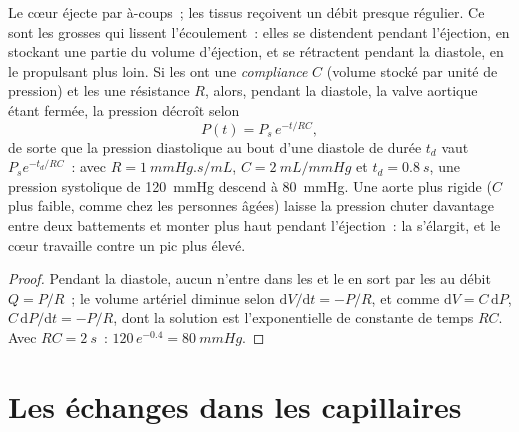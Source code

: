 \begin{theorem}\label{thm:b2:blood-circulation:windkessel}
Le cœur éjecte par à-coups~; les tissus reçoivent un débit presque
régulier. Ce sont les grosses  qui lissent l'écoulement~: elles
se distendent pendant l'éjection, en stockant une partie du volume
d'éjection, et se rétractent pendant la diastole, en le propulsant plus
loin. Si les  ont une \emph{compliance} $C$ (volume stocké par
unité de pression) et les  une résistance $R$, alors, pendant
la diastole, la valve aortique étant fermée, la pression décroît selon
\[
P(t) = P_{s}\,e^{-t/RC},
\]
de sorte que la pression diastolique au bout d'une diastole de durée
$t_d$ vaut $P_s e^{-t_d/RC}$~: avec $R = \qty{1}{mmHg.s/mL}$, $C =
\qty{2}{mL/mmHg}$ et $t_d = \qty{0.8}{s}$, une pression systolique de
\qty{120}{mmHg} descend à \qty{80}{mmHg}. Une aorte plus rigide ($C$
plus faible, comme chez les personnes âgées) laisse la pression chuter
davantage entre deux battements et monter plus haut pendant
l'éjection~: la \emph{} s'élargit, et le cœur
travaille contre un pic plus élevé.
\end{theorem}
\begin{proof}
Pendant la diastole, aucun  n'entre dans les  et le  en
sort par les  au débit $Q = P/R$~; le volume artériel diminue
selon
$\mathrm{d}V/\mathrm{d}t = -P/R$, et comme $\mathrm{d}V = C\,
\mathrm{d}P$, $C\,\mathrm{d}P/\mathrm{d}t = -P/R$, dont la solution est
l'exponentielle de constante de temps $RC$. Avec $RC = \qty{2}{s}$~:
$120\,e^{-0.4} = \qty{80}{mmHg}$.
\end{proof}

\section{Les échanges dans les capillaires}

